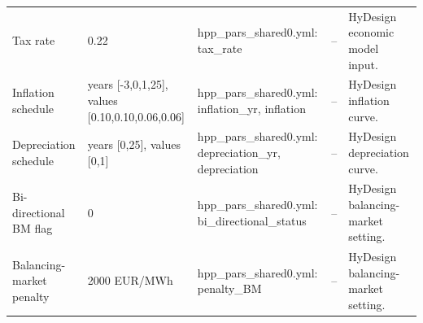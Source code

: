 \begin{center}
\begin{longtable}{p{} p{} p{} p{} p{}}
Tax rate & 0.22 & hpp\_pars\_shared0.yml: tax\_rate & -- & HyDesign economic model input. \\
Inflation schedule & years [-3,0,1,25], values [0.10,0.10,0.06,0.06] & hpp\_pars\_shared0.yml: inflation\_yr, inflation & -- & HyDesign inflation curve. \\
Depreciation schedule & years [0,25], values [0,1] & hpp\_pars\_shared0.yml: depreciation\_yr, depreciation & -- & HyDesign depreciation curve. \\
Bi-directional BM flag & 0 & hpp\_pars\_shared0.yml: bi\_directional\_status & -- & HyDesign balancing-market setting. \\
Balancing-market penalty & 2000 EUR/MWh & hpp\_pars\_shared0.yml: penalty\_BM & -- & HyDesign balancing-market setting. \\


\end{longtable}
\end{center}
